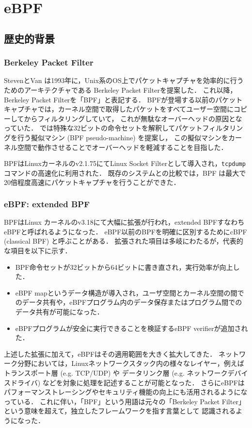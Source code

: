 \chapter{eBPF}
\label{chap:ebpf}
\section{歴史的背景}
\subsection{Berkeley Packet Filter}
StevenとVan \cite{berkeley-packet-filter}は1993年に，Unix系のOS上でパケットキャプチャを効率的に行うためのアーキテクチャである
Berkeley Packet Filterを提案した．
これ以降，Berkeley Packet Filterを「BPF」と表記する．
BPFが登場する以前のパケットキャプチャでは，カーネル空間で取得したパケットをすべてユーザー空間にコピーしてからフィルタリングしていて，
これが無駄なオーバーヘッドの原因となっていた．
\cite{berkeley-packet-filter}では特殊な32ビットの命令セットを解釈してパケットフィルタリングを行う擬似マシン (BPF pseudo-machine) を提案し，
この擬似マシンをカーネル空間で動作させることでオーバーヘッドを軽減することを目指した．

BPFはLinuxカーネルのv2.1.75にてLinux Socket Filterとして導入され，\texttt{tcpdump}コマンドの高速化に利用された．
既存のシステムとの比較では，BPF は最大で20倍程度高速にパケットキャプチャを行うことができた．

\subsection{eBPF: extended BPF}
BPFはLinux カーネルのv3.18にて大幅に拡張が行われ，extended BPFすなわちeBPFと呼ばれるようになった．
eBPF以前のBPFを明確に区別するためにcBPF (classical BPF) と呼ぶことがある．
拡張された項目は多岐にわたるが，代表的な項目を以下に示す．
\begin{itemize}
  \item BPF命令セットが32ビットから64ビットに書き直され，実行効率が向上した．
  \item eBPF mapというデータ構造が導入され，ユーザ空間とカーネル空間の間でのデータ共有や，eBPFプログラム内のデータ保存またはプログラム間でのデータ共有が可能になった．
  \item eBPFプログラムが安全に実行できることを検証するeBPF verifierが追加された．
\end{itemize}

上述した拡張に加えて，eBPFはその適用範囲を大きく拡大してきた．
ネットワーク分野においては，Linuxネットワークスタック内の様々なレイヤー，例えばトランスポート層 (e.g. TCP/UDP) や
データリンク層 (e.g. ネットワークデバイスドライバ) などを対象に処理を記述することが可能となった．
さらにeBPFはパフォーマンストレーシングやセキュリティ機能の向上にも活用されるようになっている．
これに伴い，「BPF」という用語は元々の「Berkeley Packet Filter」という意味を超えて，独立したフレームワークを指す言葉として
認識されるようになった．

